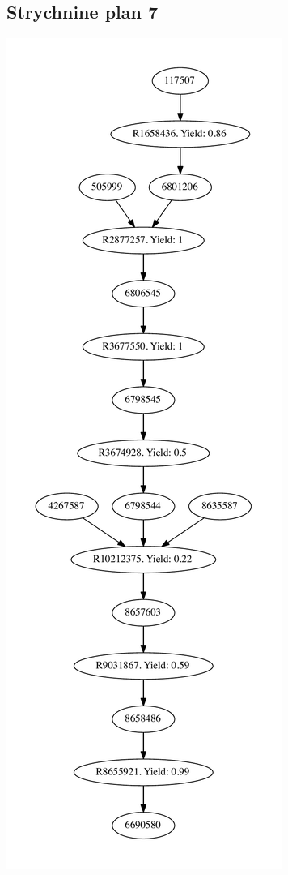 \documentclass[a4paper,10pt,titlepage]{paper}
\begin{document}
\subsection{Strychnine plan 7}
\centering
\includegraphics[scale=0.4]{Synteseplaner/Strychnine/plan7.pdf}
\label{Appendix::Strychnine7}
\end{document}
